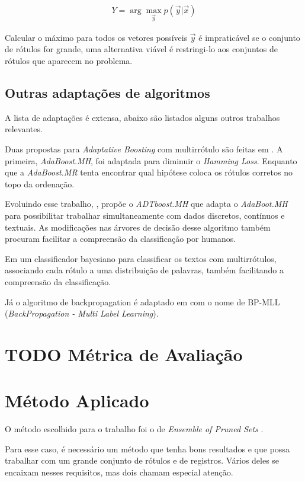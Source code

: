\documentclass[runningheads,a4paper]{llncs}
\begin{document}
\begin{align*}
	Y = \arg \max_{\vec{y}} p(\vec{y} | \vec{x})
\end{align*}

Calcular o máximo para todos os vetores possíveis $\vec{y}$ é impraticável se o conjunto de rótulos for grande, uma alternativa viável é restringi-lo aos conjuntos de rótulos que aparecem no problema.

\subsection{Outras adaptações de algoritmos}

A lista de adaptações é extensa, abaixo são listados alguns outros trabalhos relevantes.

Duas propostas para \textit{Adaptative Boosting} com multirrótulo são feitas em \cite{Schapire2000-yt}. A primeira, \textit{AdaBoost.MH}, foi adaptada para diminuir o \textit{Hamming Loss}. Enquanto que a \textit{AdaBoost.MR} tenta encontrar qual hipótese coloca os rótulos corretos no topo da ordenação.

Evoluindo esse trabalho, \cite{De_Comite2003-lg}, propõe o \textit{ADTboost.MH} que adapta o \textit{AdaBoot.MH} para possibilitar trabalhar simultaneamente com dados discretos, contínuos e textuais. As modificações nas árvores de decisão desse algoritmo também procuram facilitar a compreensão da classificação por humanos.

Em \cite{McCallum1999-iz} um classificador bayesiano para classificar os textos com multirrótulos, associando cada rótulo a uma distribuição de palavras, também facilitando a compreensão da classificação.

Já o algoritmo de backpropagation é adaptado em \cite{Zhang2006-vf} com o nome de BP-MLL (\textit{BackPropagation - Multi Label Learning}).


\section{TODO Métrica de Avaliação}

\section{Método Aplicado} \label{sec:justificativa}

O método escolhido para o trabalho foi o de \textit{Ensemble of Pruned Sets} \cite{Read2008-bt}.

Para esse caso, é necessário um método que tenha bons resultados e que possa trabalhar com um grande conjunto de rótulos e de registros. Vários deles se encaixam nesses requisitos, mas dois chamam especial atenção.
\end{document}
